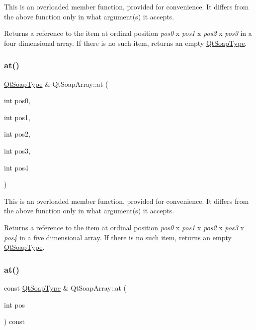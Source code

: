 This is an overloaded member function, provided for convenience. It differs from the above function only in what argument(s) it accepts.

Returns a reference to the item at ordinal position {\itshape pos0} x {\itshape pos1} x {\itshape pos2} x {\itshape pos3} in a four dimensional array. If there is no such item, returns an empty \mbox{\hyperlink{class_qt_soap_type}{Qt\+Soap\+Type}}. \mbox{\label{class_qt_soap_array_afa1072c72234f76cd63af16ec88972e4}} 
\subsubsection{\texorpdfstring{at()}{at()}\hspace{0.1cm}{\footnotesize\ttfamily [5/10]}}
{\footnotesize\ttfamily \mbox{\hyperlink{class_qt_soap_type}{Qt\+Soap\+Type}} \& Qt\+Soap\+Array\+::at (\begin{DoxyParamCaption}\item[{int}]{pos0,  }\item[{int}]{pos1,  }\item[{int}]{pos2,  }\item[{int}]{pos3,  }\item[{int}]{pos4 }\end{DoxyParamCaption})}

This is an overloaded member function, provided for convenience. It differs from the above function only in what argument(s) it accepts.

Returns a reference to the item at ordinal position {\itshape pos0} x {\itshape pos1} x {\itshape pos2} x {\itshape pos3} x {\itshape pos4} in a five dimensional array. If there is no such item, returns an empty \mbox{\hyperlink{class_qt_soap_type}{Qt\+Soap\+Type}}. \mbox{\label{class_qt_soap_array_afa9b9c1a5401d07d917f3998e625dbc3}} 
\subsubsection{\texorpdfstring{at()}{at()}\hspace{0.1cm}{\footnotesize\ttfamily [6/10]}}
{\footnotesize\ttfamily const \mbox{\hyperlink{class_qt_soap_type}{Qt\+Soap\+Type}} \& Qt\+Soap\+Array\+::at (\begin{DoxyParamCaption}\item[{int}]{pos }\end{DoxyParamCaption}) const}

